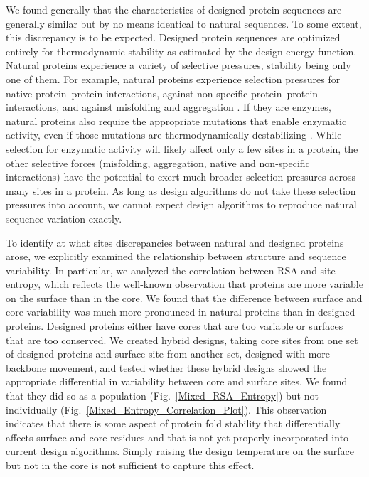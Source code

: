 \documentclass[12pt]{article}
\begin{document}
We found generally that the characteristics of designed protein sequences are generally similar but by no means identical to natural sequences. To some extent, this discrepancy is to be expected. Designed protein sequences are optimized entirely for thermodynamic stability as estimated by the design energy function. Natural proteins experience a variety of selective pressures, stability being only one of them. For example, natural proteins experience selection pressures for native protein--protein interactions, against non-specific protein--protein interactions, and against misfolding and aggregation  \citep{Fraser2002, Zarrinpar2003, Drummond2008, Levyetal2012}. If they are enzymes, natural proteins also require the appropriate mutations that enable enzymatic activity, even if those mutations are thermodynamically destabilizing \citep{Bloometal2006, Elcock2001}. While selection for enzymatic activity will likely affect only a few sites in a protein, the other selective forces (misfolding, aggregation, native and non-specific interactions) have the potential to exert much broader selection pressures across many sites in a protein. As long as design algorithms do not take these selection pressures into account, we cannot expect design algorithms to reproduce natural sequence variation exactly.

To identify at what sites discrepancies between natural and designed proteins arose, we explicitly examined the relationship between structure and sequence variability. In particular, we analyzed the correlation between RSA and site entropy, which reflects the well-known observation that proteins are more variable on the surface than in the core. We found that the difference between surface and core variability was much more pronounced in natural proteins than in designed proteins. Designed proteins either have cores that are too variable or surfaces that are too conserved. We created hybrid designs, taking core sites from one set of designed proteins and surface site from another set, designed with more backbone movement, and tested whether these hybrid designs showed the appropriate differential in variability between core and surface sites. We found that they did so as a population (Fig.~\ref{Mixed_RSA_Entropy}) but not individually (Fig.~\ref{Mixed_Entropy_Correlation_Plot}). This observation indicates that there is some aspect of protein fold stability that differentially affects surface and core residues and that is not yet properly incorporated into current design algorithms. Simply raising the design temperature on the surface but not in the core is not sufficient to capture this effect.
\end{document}
